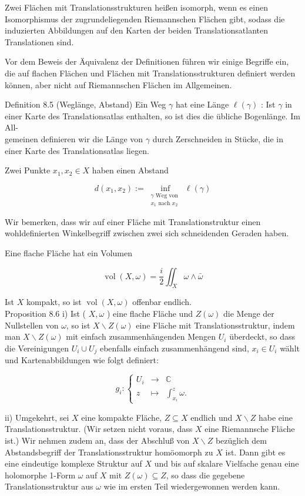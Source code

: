 \documentclass[10pt, letterpaper]{article}
\begin{document}
Zwei Flächen mit Translationsstrukturen heißen isomorph, wenn es einen Isomorphismus der zugrundeliegenden Riemannschen Flächen gibt, sodass die induzierten Abbildungen auf den Karten der beiden Translationsatlanten Translationen sind.

Vor dem Beweis der Äquivalenz der Definitionen führen wir einige Begriffe ein, die auf flachen Flächen und Flächen mit Translationsstrukturen definiert werden können, aber nicht auf Riemannschen Flächen im Allgemeinen.

Definition 8.5 (Weglänge, Abstand) Ein Weg $\gamma$ hat eine Länge $\ell(\gamma)$ : Ist $\gamma$ in einer Karte des Translationsatlas enthalten, so ist dies die übliche Bogenlänge. Im All-\\
gemeinen definieren wir die Länge von $\gamma$ durch Zerschneiden in Stücke, die in einer Karte des Translationsatlas liegen.

Zwei Punkte $x_{1}, x_{2} \in X$ haben einen Abstand

$$
d\left(x_{1}, x_{2}\right):=\inf _{\substack{\gamma \text { Weg von } \\ x_{1} \text { nach } x_{2}}} \ell(\gamma)
$$

Wir bemerken, dass wir auf einer Fläche mit Translationstruktur einen wohldefinierten Winkelbegriff zwischen zwei sich schneidenden Geraden haben.

Eine flache Fläche hat ein Volumen

$$
\operatorname{vol}(X, \omega)=\frac{i}{2} \iint_{X} \omega \wedge \bar{\omega}
$$

Ist $X$ kompakt, so ist $\operatorname{vol}(X, \omega)$ offenbar endlich.\\
Proposition 8.6 i) Ist ( $X, \omega$ ) eine flache Fläche und $Z(\omega)$ die Menge der Nullstellen von $\omega$, so ist $X \backslash Z(\omega)$ eine Fläche mit Translationsstruktur, indem man $X \backslash Z(\omega)$ mit einfach zusammenhängenden Mengen $U_{i}$ überdeckt, so dass die Vereinigungen $U_{i} \cup U_{j}$ ebenfalls einfach zusammenhängend sind, $x_{i} \in U_{i}$ wählt und Kartenabbildungen wie folgt definiert:

$$
g_{i}:\left\{\begin{array}{rlc}
U_{i} & \longrightarrow & \mathbb{C} \\
z & \longmapsto & \int_{x_{i}}^{z} \omega .
\end{array}\right.
$$

ii) Umgekehrt, sei $X$ eine kompakte Fläche, $Z \subseteq X$ endlich und $X \backslash Z$ habe eine Translationsstruktur. (Wir setzen nicht voraus, dass $X$ eine Riemannsche Fläche ist.) Wir nehmen zudem an, dass der Abschluß von $X \backslash Z$ bezüglich dem Abstandsbegriff der Translationsstruktur homöomorph zu $X$ ist. Dann gibt es eine eindeutige komplexe Struktur auf $X$ und bis auf skalare Vielfache genau eine holomorphe 1-Form $\omega$ auf $X$ mit $Z(\omega) \subseteq Z$, so dass die gegebene Translationsstruktur aus $\omega$ wie im ersten Teil wiedergewonnen werden kann.
\end{document}
